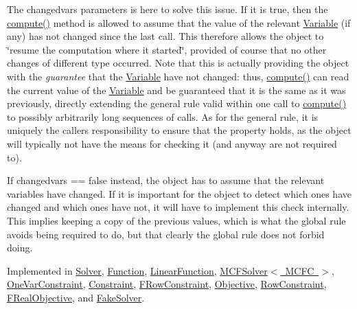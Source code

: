 The changedvars parameters is here to solve this issue. If it is true, then the \mbox{\hyperlink{class_s_m_spp__di__unipi__it_1_1_thin_compute_interface_a00fd6363d98ea46bcc273842b327d050}{compute()}} method is allowed to assume that the value of the relevant \mbox{\hyperlink{class_s_m_spp__di__unipi__it_1_1_variable}{Variable}} (if any) has not changed since the last call. This therefore allows the object to \char`\"{}resume the computation where it started\char`\"{}, provided of course that no other changes of different type occurred. Note that this is actually providing the object with the {\itshape guarantee} that the \mbox{\hyperlink{class_s_m_spp__di__unipi__it_1_1_variable}{Variable}} have not changed\+: thus, \mbox{\hyperlink{class_s_m_spp__di__unipi__it_1_1_thin_compute_interface_a00fd6363d98ea46bcc273842b327d050}{compute()}} can read the current value of the \mbox{\hyperlink{class_s_m_spp__di__unipi__it_1_1_variable}{Variable}} and be guaranteed that it is the same as it was previously, directly extending the general rule valid within one call to \mbox{\hyperlink{class_s_m_spp__di__unipi__it_1_1_thin_compute_interface_a00fd6363d98ea46bcc273842b327d050}{compute()}} to possibly arbitrarily long sequences of calls. As for the general rule, it is uniquely the caller\textquotesingle{}s responsibility to ensure that the property holds, as the object will typically not have the means for checking it (and anyway are not required to).

If changedvars == false instead, the object has to assume that the relevant variables have changed. If it is important for the object to detect which ones have changed and which ones have not, it will have to implement this check internally. This implies keeping a copy of the previous values, which is what the global rule avoids being required to do, but that clearly the global rule does not forbid doing. 

Implemented in \mbox{\hyperlink{class_s_m_spp__di__unipi__it_1_1_solver_a504d4e3e174c7a518cc66156a8a45ce5}{Solver}}, \mbox{\hyperlink{class_s_m_spp__di__unipi__it_1_1_function_a504d4e3e174c7a518cc66156a8a45ce5}{Function}}, \mbox{\hyperlink{class_s_m_spp__di__unipi__it_1_1_linear_function_afc8ff54ab05d22f4cca0fb0bfbeb7a49}{Linear\+Function}}, \mbox{\hyperlink{class_s_m_spp__di__unipi__it_1_1_m_c_f_solver_afc8ff54ab05d22f4cca0fb0bfbeb7a49}{M\+C\+F\+Solver$<$ M\+C\+F\+C $>$}}, \mbox{\hyperlink{class_s_m_spp__di__unipi__it_1_1_one_var_constraint_afc8ff54ab05d22f4cca0fb0bfbeb7a49}{One\+Var\+Constraint}}, \mbox{\hyperlink{class_s_m_spp__di__unipi__it_1_1_constraint_a504d4e3e174c7a518cc66156a8a45ce5}{Constraint}}, \mbox{\hyperlink{class_s_m_spp__di__unipi__it_1_1_f_row_constraint_afc8ff54ab05d22f4cca0fb0bfbeb7a49}{F\+Row\+Constraint}}, \mbox{\hyperlink{class_s_m_spp__di__unipi__it_1_1_objective_a504d4e3e174c7a518cc66156a8a45ce5}{Objective}}, \mbox{\hyperlink{class_s_m_spp__di__unipi__it_1_1_row_constraint_a504d4e3e174c7a518cc66156a8a45ce5}{Row\+Constraint}}, \mbox{\hyperlink{class_s_m_spp__di__unipi__it_1_1_f_real_objective_afc8ff54ab05d22f4cca0fb0bfbeb7a49}{F\+Real\+Objective}}, and \mbox{\hyperlink{class_s_m_spp__di__unipi__it_1_1_fake_solver_afc8ff54ab05d22f4cca0fb0bfbeb7a49}{Fake\+Solver}}.


